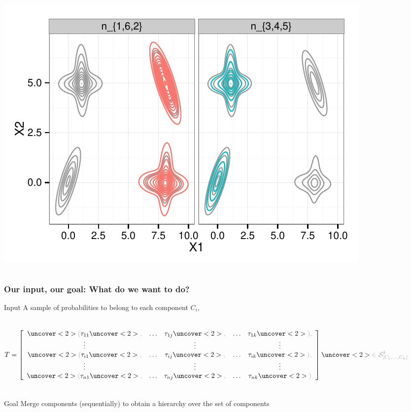 \begin{frame}[t]
\begin{columns}[T]
\includegraphics[height=0.2\textheight]{static_figures/baudry_ex4_1_all_distributions_2c.pdf}
\end{columns}
\end{frame}

\begin{frame}[t]
\frametitle{Our input, our goal: What do we want to do?}

\begin{block}{Input}
A sample of probabilities to belong to each component $C_i$, 
\begin{columns}
\[ T = \left[ \begin{array}{ccccc}
\idea{(}\tau_{11}\idea{,} & \dots & \tau_{1j}\idea{,} & \dots & \tau_{1k}\idea{),} \\
\vdots      & &    \vdots                     & &    \vdots                     \\
\idea{(}\tau_{i1}\idea{,} & \dots & \tau_{ij}\idea{,} & \dots & \tau_{ik}\idea{),} \\
\vdots      & &      \vdots                   & &       \vdots                  \\
\idea{(}\tau_{n1}\idea{,} & \dots & \tau_{nj}\idea{,} & \dots & \tau_{nk}\idea{)}
\end{array} \right] 
\idea{ \in \mathcal{S}_{[C_1,\dots,C_k]}^k } \]
\end{columns}
\end{block}

\pause
\begin{alertblock}{Goal}
\alert{Merge} components (sequentially) to obtain a hierarchy over the set of components %
\end{alertblock}
\end{frame}